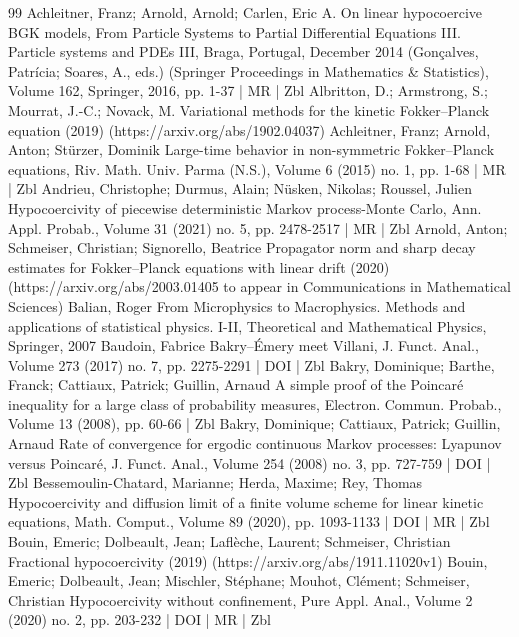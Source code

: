 \documentclass[10pt]{amsart}
\theoremstyle{definition}\newtheorem{defi}[theo]{Definition}\newtheorem{rema}[theo]{Remark}\newtheorem{exam}[theo]{Example}\newtheorem{exem}[theo]{Example}\newtheorem{nota}[theo]{Notation}
\begin{document}
\begin{thebibliography}{99}
Achleitner, Franz; Arnold, Arnold; Carlen, Eric A. On linear hypocoercive BGK models, From Particle Systems to Partial Differential Equations III. Particle systems and PDEs III, Braga, Portugal, December 2014 (Gonçalves, Patrícia; Soares, A., eds.) (Springer Proceedings in Mathematics \& Statistics), Volume 162, Springer, 2016, pp. 1-37 | MR | Zbl
Albritton, D.; Armstrong, S.; Mourrat, J.-C.; Novack, M. Variational methods for the kinetic Fokker–Planck equation (2019) (https://arxiv.org/abs/1902.04037)
Achleitner, Franz; Arnold, Anton; Stürzer, Dominik Large-time behavior in non-symmetric Fokker–Planck equations, Riv. Math. Univ. Parma (N.S.), Volume 6 (2015) no. 1, pp. 1-68 | MR | Zbl
Andrieu, Christophe; Durmus, Alain; Nüsken, Nikolas; Roussel, Julien Hypocoercivity of piecewise deterministic Markov process-Monte Carlo, Ann. Appl. Probab., Volume 31 (2021) no. 5, pp. 2478-2517 | MR | Zbl
Arnold, Anton; Schmeiser, Christian; Signorello, Beatrice Propagator norm and sharp decay estimates for Fokker–Planck equations with linear drift (2020) (https://arxiv.org/abs/2003.01405 to appear in Communications in Mathematical Sciences)
Balian, Roger From Microphysics to Macrophysics. Methods and applications of statistical physics. I-II, Theoretical and Mathematical Physics, Springer, 2007
Baudoin, Fabrice Bakry–Émery meet Villani, J. Funct. Anal., Volume 273 (2017) no. 7, pp. 2275-2291 | DOI | Zbl
Bakry, Dominique; Barthe, Franck; Cattiaux, Patrick; Guillin, Arnaud A simple proof of the Poincaré inequality for a large class of probability measures, Electron. Commun. Probab., Volume 13 (2008), pp. 60-66 | Zbl
Bakry, Dominique; Cattiaux, Patrick; Guillin, Arnaud Rate of convergence for ergodic continuous Markov processes: Lyapunov versus Poincaré, J. Funct. Anal., Volume 254 (2008) no. 3, pp. 727-759 | DOI | Zbl
Bessemoulin-Chatard, Marianne; Herda, Maxime; Rey, Thomas Hypocoercivity and diffusion limit of a finite volume scheme for linear kinetic equations, Math. Comput., Volume 89 (2020), pp. 1093-1133 | DOI | MR | Zbl
Bouin, Emeric; Dolbeault, Jean; Laflèche, Laurent; Schmeiser, Christian Fractional hypocoercivity (2019) (https://arxiv.org/abs/1911.11020v1)
Bouin, Emeric; Dolbeault, Jean; Mischler, Stéphane; Mouhot, Clément; Schmeiser, Christian Hypocoercivity without confinement, Pure Appl. Anal., Volume 2 (2020) no. 2, pp. 203-232 | DOI | MR | Zbl

\end{thebibliography}
\end{document}
